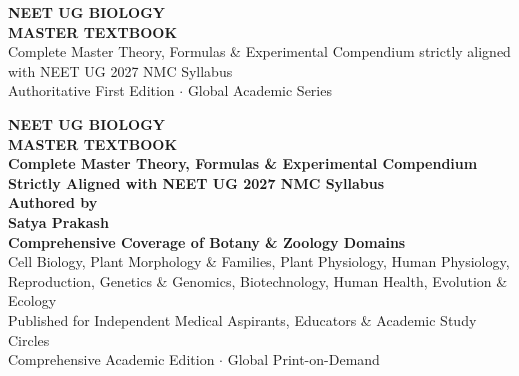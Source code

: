 \documentclass[10pt,twoside,openright]{book}
\begin{document}
\frontmatter

\thispagestyle{empty}
\vspace*{4cm}
\begin{center}
  {\Huge\bfseries\color{primarydark} NEET UG BIOLOGY}\\[0.6cm]
  {\Large\bfseries\color{accentblue} MASTER TEXTBOOK}\\[1.5cm]
  {\normalsize\color{gray} Complete Master Theory, Formulas \& Experimental Compendium strictly aligned with NEET UG 2027 NMC Syllabus}\\[0.4cm]
  {\small\color{gray} Authoritative First Edition $\cdot$ Global Academic Series}
\end{center}
\cleardoublepage

\thispagestyle{empty}
\vspace*{2cm}
\begin{center}
  {\Huge\bfseries\color{primarydark} NEET UG BIOLOGY}\\[0.4cm]
  {\LARGE\bfseries\color{primarydark} MASTER TEXTBOOK}\\[0.8cm]
  {\Large\bfseries\color{accentblue} Complete Master Theory, Formulas \& Experimental Compendium}\\[0.2cm]
  {\large\bfseries\color{accentblue} Strictly Aligned with NEET UG 2027 NMC Syllabus}\\[1.8cm]
  
  {\large\textbf{Authored by}}\\[0.3cm]
  {\LARGE\bfseries\color{primarydark} Satya Prakash}\\[1.5cm]

  {\normalsize\textbf{Comprehensive Coverage of Botany \& Zoology Domains}}\\[0.3cm]
  {\small Cell Biology, Plant Morphology \& Families, Plant Physiology, Human Physiology,}\\[0.1cm]
  {\small Reproduction, Genetics \& Genomics, Biotechnology, Human Health, Evolution \& Ecology}\\[2.0cm]

  {\footnotesize Published for Independent Medical Aspirants, Educators \& Academic Study Circles}\\[0.2cm]
  {\footnotesize Comprehensive Academic Edition $\cdot$ Global Print-on-Demand}
\end{center}
\cleardoublepage
\end{document}
